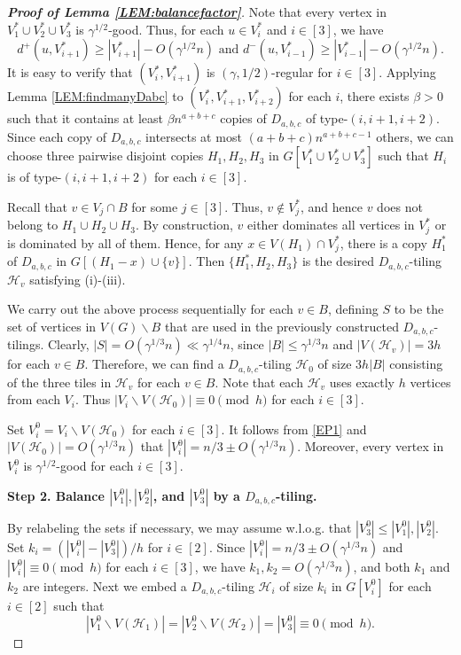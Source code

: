 \documentclass[11pt,a4paper,reqno]{amsart}
\theoremstyle{definition} %
\begin{document}
\begin{proof}[\textbf{Proof of Lemma \ref{LEM:balancefactor}}]
Note that every vertex in $V^\ast_1\cup V^\ast_2\cup V^\ast_3$ is $\gamma^{1/2}$-good. Thus, for each $u\in V^\ast_i$ and $i\in[3]$, we have
$$
d^+(u,V^\ast_{i+1})\geqslant |V^\ast_{i+1}|-O(\gamma^{1/2} n)
 \text{ and } 
d^-(u,V^\ast_{i-1})\geqslant |V^\ast_{i-1}|-O(\gamma^{1/2} n).
$$
It is easy to verify that $(V_i^\ast,V_{i+1}^\ast)$ is $(\gamma,1/2)$-regular for  $i\in[3]$. Applying Lemma \ref{LEM:findmanyDabc} to $(V_i^\ast,V_{i+1}^\ast,V_{i+2}^\ast)$ for each $i$, there exists $\beta>0$ such that it contains at least $\beta n^{a+b+c}$ copies of $D_{a,b,c}$ of type-$(i,i+1,i+2)$. Since each copy of $D_{a,b,c}$ intersects at most $(a+b+c)n^{a+b+c-1}$ others, we can choose three pairwise disjoint copies $H_1,H_2,H_3$ in $G[V^\ast_1\cup V^\ast_2\cup V^\ast_3]$ such that $H_i$ is of type-$(i,i+1,i+2)$ for each $i\in[3]$.


Recall that $v\in V_j\cap B$ for some $j\in[3]$. Thus, $v\notin V_j^{\ast}$, and hence $v$ does not belong to $H_1\cup H_2\cup H_3$. By construction, $v$ either dominates all vertices in $V_j^{\ast}$ or is dominated by all of them. Hence, for any $x\in V(H_1)\cap V_j^{\ast}$, there is a copy $H_1^\ast$ of $D_{a,b,c}$ in $G[(H_1-x)\cup \{v\}]$. Then $\{H^\ast_1,H_{2},H_{3}\}$ is the desired $D_{a,b,c}$-tiling $\mathcal{H}_v$ satisfying (i)-(iii). 

We carry out the above process sequentially for each $v\in B$, defining $S$ to be the set of vertices in $V(G)\backslash B$ that are used in the previously constructed $D_{a,b,c}$-tilings. Clearly, $|S|=O(\gamma^{1/3}n)\ll\gamma^{1/4}n$, since $|B|\leqslant \gamma^{1/3}n$ and $|V(\mathcal{H}_v)|=3h$ for each $v\in B$. Therefore, we can find a $D_{a,b,c}$-tiling $\mathcal{H}_0$ of size $3h|B|$ consisting of the three tiles in $\mathcal{H}_v$ for each $v\in B$. Note that each $\mathcal{H}_v$ uses exactly $h$ vertices from each $V_i$. Thus $|V_i\backslash V(\mathcal{H}_0)|\equiv 0 \pmod {h}$ for each $i\in [3]$. 

\medskip
    
Set $V_i^0=V_i\backslash V(\mathcal{H}_0)$ for each $i\in [3]$. It follows from \ref{EP1} and $|V(\mathcal{H}_0)|=O(\gamma^{1/3}n)$ that $|V_i^0|=n/3\pm O(\gamma^{1/3}n)$. Moreover, every vertex in $V_i^0$ is $\gamma^{1/2}$-good for each $i\in[3]$.
   
\medskip
\textbf{Step 2. Balance $|V_1^0|,|V_2^0|$, and $|V_3^0|$ by a $D_{a,b,c}$-tiling.}
\medskip

By relabeling the sets if necessary, we may assume w.l.o.g. that $|V_3^0|\leqslant |V_1^0|,|V_2^0|$. Set $k_i=(|V_i^0|-|V_3^0|)/h$ for $i\in [2]$. Since $|V^0_{i}|=n/3\pm O(\gamma^{1/3} n)$ and $|V^0_{i}|\equiv 0\pmod h$ for each $i\in[3]$, we have $k_1,k_2 = O(\gamma^{1/3} n)$, and both $k_1$ and $k_2$ are integers. Next we embed a $D_{a,b,c}$-tiling $\mathcal{H}_i$ of size $k_i$ in $G[V_i^0]$ for each $i\in[2]$ such that
$$
|V^0 _1\backslash V(\mathcal{H}_1)|=|V^0_2\backslash V(\mathcal{H}_2)|=|V^0_3|\equiv 0\pmod h.
$$


\end{proof}
\end{document}
